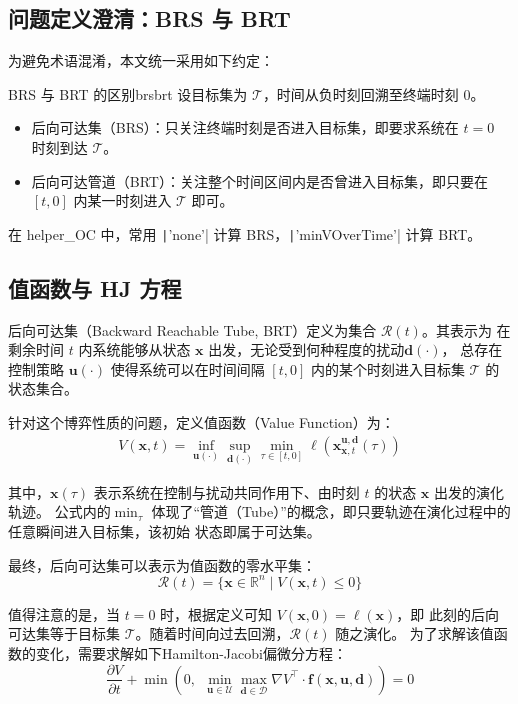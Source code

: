 \documentclass[11pt]{ctexrep}
\begin{document}
\subsection{问题定义澄清：BRS 与 BRT}
为避免术语混淆，本文统一采用如下约定：
\begin{defn}{BRS 与 BRT 的区别}{brsbrt}
设目标集为 $\mathcal{T}$，时间从负时刻回溯至终端时刻 $0$。
\begin{itemize}
    \item 后向可达集（BRS）：只关注终端时刻是否进入目标集，即要求系统在 $t=0$ 时刻到达 $\mathcal{T}$。
    \item 后向可达管道（BRT）：关注整个时间区间内是否曾进入目标集，即只要在 $[t,0]$ 内某一时刻进入 $\mathcal{T}$ 即可。
\end{itemize}
在 helper\_OC 中，常用 \texttt|'none'| 计算 BRS，\texttt|'minVOverTime'| 计算 BRT。
\end{defn}

\subsection{值函数与 HJ 方程}
后向可达集（Backward Reachable Tube, BRT）定义为集合 $\mathcal{R}(t)$。其表示为
在剩余时间 $t$ 内系统能够从状态 $\mathbf{x}$ 出发，无论受到何种程度的扰动$\mathbf{d}(\cdot)$，
总存在控制策略 $\mathbf{u}(\cdot)$ 使得系统可以在时间间隔 $[t,0]$ 内的某个时刻进入目标集 $\mathcal{T}$ 的状态集合。


针对这个博弈性质的问题，定义值函数（Value Function）为：
\begin{equation}
\begin{aligned}
V(\mathbf{x},t)
= \inf_{\mathbf{u}(\cdot)} \sup_{\mathbf{d}(\cdot)}
\min_{\tau \in[t,0]} \ell\!\left(\mathbf{x}_{\mathbf{x},t}^{\mathbf{u},\mathbf{d}}(\tau)\right)
\end{aligned}
\end{equation}

其中，$\mathbf{x}(\tau)$ 表示系统在控制与扰动共同作用下、由时刻 $t$ 的状态 $\mathbf{x}$ 出发的演化轨迹。
公式内的$\min_{\tau}$ 体现了“管道（Tube）”的概念，即只要轨迹在演化过程中的任意瞬间进入目标集，该初始
状态即属于可达集。


最终，后向可达集可以表示为值函数的零水平集：
\begin{equation}
\mathcal{R}(t) = \{\mathbf{x} \in \mathbb{R}^n \mid V(\mathbf{x},t) \leq 0\}
\end{equation}

值得注意的是，当 $t=0$ 时，根据定义可知 $V(\mathbf{x},0) = \ell(\mathbf{x})$，即
此刻的后向可达集等于目标集 $\mathcal{T}$。随着时间向过去回溯，$\mathcal{R}(t)$ 随之演化。
为了求解该值函数的变化，需要求解如下Hamilton-Jacobi偏微分方程：
\begin{equation}
\frac{\partial V}{\partial t} + \min \left(
0,\ \ 
\min_{\mathbf{u} \in \mathcal{U}} \max_{\mathbf{d} \in \mathcal{D}} \nabla V ^\top \cdot \mathbf{f}(\mathbf{x},\mathbf{u},\mathbf{d})
\right)
 = 0
\end{equation}
\end{document}
